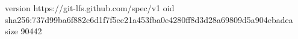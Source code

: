 version https://git-lfs.github.com/spec/v1
oid sha256:737d99ba6f882c6d1f7f5ee21a453fba0e4280ff8d3d28a69809d5a904ebadea
size 90442
